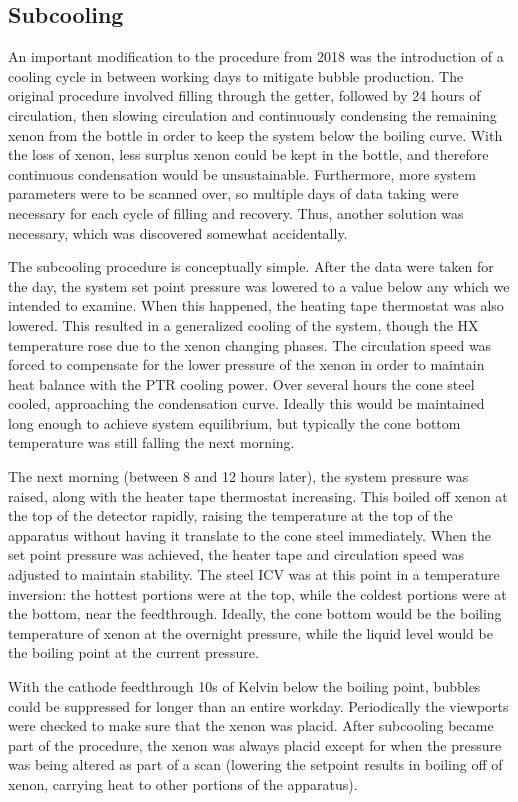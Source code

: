 \subsection{Subcooling}
\label{sec:subcooling}
An important modification to the procedure from 2018 was the introduction of a cooling cycle in between working days to mitigate bubble production.
The original procedure involved filling through the getter, followed by 24 hours of circulation, then slowing circulation and continuously condensing the remaining xenon from the bottle in order to keep the system below the boiling curve.
With the loss of xenon, less surplus xenon could be kept in the bottle, and therefore continuous condensation would be unsustainable.
Furthermore, more system parameters were to be scanned over, so multiple days of data taking were necessary for each cycle of filling and recovery.
Thus, another solution was necessary, which was discovered somewhat accidentally.

The subcooling procedure is conceptually simple.
After the data were taken for the day, the system set point pressure was lowered to a value below any which we intended to examine.
When this happened, the heating tape thermostat was also lowered.
This resulted in a generalized cooling of the system, though the HX temperature rose due to the xenon changing phases.
The circulation speed was forced to compensate for the lower pressure of the xenon in order to maintain heat balance with the PTR cooling power.
Over several hours the cone steel cooled, approaching the condensation curve.
Ideally this would be maintained long enough to achieve system equilibrium, but typically the cone bottom temperature was still falling the next morning.

The next morning (between 8 and 12 hours later), the system pressure was raised, along with the heater tape thermostat increasing. 
This boiled off xenon at the top of the detector rapidly, raising the temperature at the top of the apparatus without having it translate to the cone steel immediately.
When the set point pressure was achieved, the heater tape and circulation speed was adjusted to maintain stability.
The steel ICV was at this point in a temperature inversion: the hottest portions were at the top, while the coldest portions were at the bottom, near the feedthrough.
Ideally, the cone bottom would be the boiling temperature of xenon at the overnight pressure, while the liquid level would be the boiling point at the current pressure.

With the cathode feedthrough 10s of Kelvin below the boiling point, bubbles could be suppressed for longer than an entire workday.
Periodically the viewports were checked to make sure that the xenon was placid.
After subcooling became part of the procedure, the xenon was always placid except for when the pressure was being altered as part of a scan (lowering the setpoint results in boiling off of xenon, carrying heat to other portions of the apparatus).

